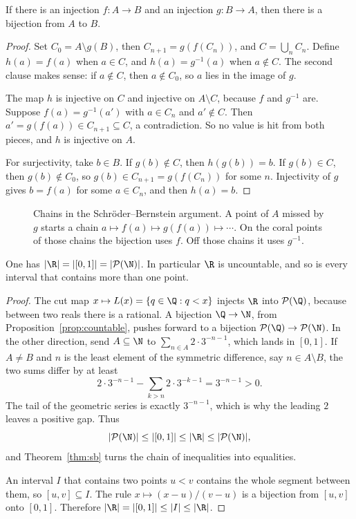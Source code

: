\begin{theorem}\label{thm:sb}
If there is an injection $f:A\to B$ and an injection $g:B\to A$, then there is a bijection from $A$ to $B$.
\end{theorem}
\begin{proof}
Set $C_0=A\setminus g(B)$, then $C_{n+1}=g(f(C_n))$, and $C=\bigcup_n C_n$. Define $h(a)=f(a)$ when $a\in C$, and $h(a)=g^{-1}(a)$ when $a\notin C$. The second clause makes sense: if $a\notin C$, then $a\notin C_0$, so $a$ lies in the image of $g$.

The map $h$ is injective on $C$ and injective on $A\setminus C$, because $f$ and $g^{-1}$ are. Suppose $f(a)=g^{-1}(a')$ with $a\in C_n$ and $a'\notin C$. Then $a'=g(f(a))\in C_{n+1}\subseteq C$, a contradiction. So no value is hit from both pieces, and $h$ is injective on $A$.

For surjectivity, take $b\in B$. If $g(b)\notin C$, then $h(g(b))=b$. If $g(b)\in C$, then $g(b)\notin C_0$, so $g(b)\in C_{n+1}=g(f(C_n))$ for some $n$. Injectivity of $g$ gives $b=f(a)$ for some $a\in C_n$, and then $h(a)=b$.
\end{proof}

\begin{figure}[ht]
\centering
{}
\caption{Chains in the Schr\"oder--Bernstein argument. A point of $A$ missed by $g$ starts a chain $a\mapsto f(a)\mapsto g(f(a))\mapsto\cdots$. On the coral points of those chains the bijection uses $f$. Off those chains it uses $g^{-1}$.}
\label{fig:sb}
\end{figure}

\begin{theorem}\label{thm:continuum}
One has $|\R|=|[0,1]|=|\mathcal P(\N)|$. In particular $\R$ is uncountable, and so is every interval that contains more than one point.
\end{theorem}
\begin{proof}
The cut map $x\mapsto L(x)=\{q\in\Q:q<x\}$ injects $\R$ into $\mathcal P(\Q)$, because between two reals there is a rational. A bijection $\Q\to\N$, from Proposition~\ref{prop:countable}, pushes forward to a bijection $\mathcal P(\Q)\to\mathcal P(\N)$. In the other direction, send $A\subseteq\N$ to $\sum_{n\in A}2\cdot 3^{-n-1}$, which lands in $[0,1]$. If $A\ne B$ and $n$ is the least element of the symmetric difference, say $n\in A\setminus B$, the two sums differ by at least
\[
2\cdot 3^{-n-1}-\sum_{k>n}2\cdot 3^{-k-1}=3^{-n-1}>0.
\]
The tail of the geometric series is exactly $3^{-n-1}$, which is why the leading $2$ leaves a positive gap. Thus
\[|\mathcal P(\N)|\le|[0,1]|\le|\R|\le|\mathcal P(\N)|,\]
and Theorem~\ref{thm:sb} turns the chain of inequalities into equalities.

An interval $I$ that contains two points $u<v$ contains the whole segment between them, so $[u,v]\subseteq I$. The rule $x\mapsto (x-u)/(v-u)$ is a bijection from $[u,v]$ onto $[0,1]$. Therefore $|\R|=|[0,1]|\le|I|\le|\R|$.
\end{proof}

